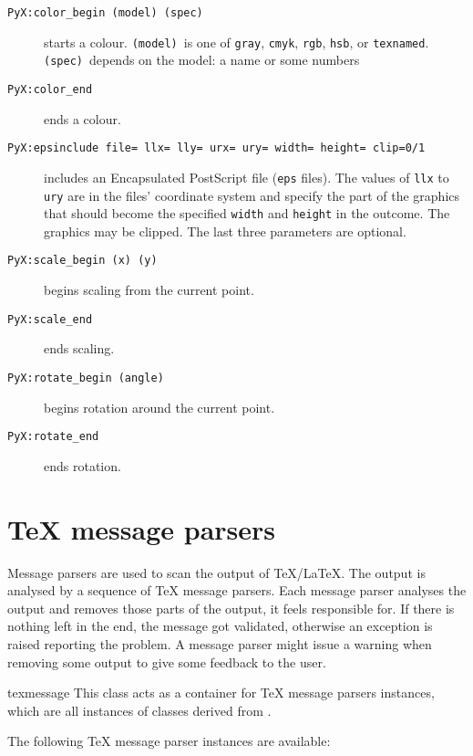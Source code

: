 \begin{description}
\item[\texttt{PyX:color\_begin (model) (spec)}]
  starts a colour. \texttt{(model)}~is one of
  \texttt{gray}, \texttt{cmyk}, \texttt{rgb}, \texttt{hsb}, or
  \texttt{texnamed}. \texttt{(spec)}~depends on the model: a name or
  some numbers
\item[\texttt{PyX:color\_end}]
  ends a colour.
\item[\texttt{PyX:epsinclude file= llx= lly= urx= ury= width= height= clip=0/1}]
  includes an Encapsulated PostScript file (\texttt{eps}
  files). The values of \texttt{llx} to \texttt{ury} are in the files'
  coordinate system and specify the part of the graphics that should
  become the specified \texttt{width} and \texttt{height} in the
  outcome. The graphics may be clipped. The last three parameters are
  optional.
\item[\texttt{PyX:scale\_begin (x) (y)}]
  begins scaling from the current point.
\item[\texttt{PyX:scale\_end}]
  ends scaling.
\item[\texttt{PyX:rotate\_begin (angle)}]
  begins rotation around the current point.
\item[\texttt{PyX:rotate\_end}]
  ends rotation.
\end{description}

\section{\TeX{} message parsers}

Message parsers are used to scan the output of \TeX/\LaTeX. The output
is analysed by a sequence of \TeX{} message parsers. Each message
parser analyses the output and removes those parts of the output, it
feels responsible for. If there is nothing left in the end, the
message got validated, otherwise an exception is raised reporting the
problem. A message parser might issue a warning when removing some
output to give some feedback to the user.

\begin{classdesc}{texmessage}{}
  This class acts as a container for \TeX{} message parsers instances,
  which are all instances of classes derived from .
\end{classdesc}

The following \TeX{} message parser instances are available:

